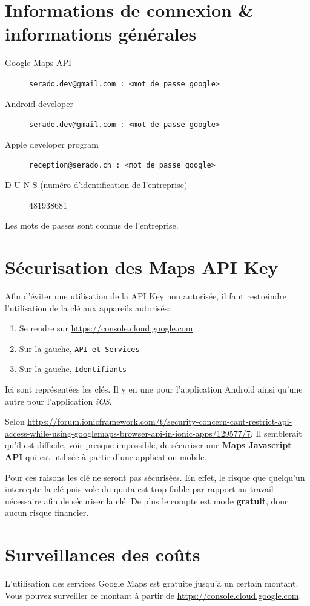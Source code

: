 \documentclass[french]{report}
\begin{document}
\section{Informations de connexion \& informations générales}
\begin{description}
    \item[Google Maps API] \verb|serado.dev@gmail.com : <mot de passe google>|
    \item[Android developer] \verb|serado.dev@gmail.com : <mot de passe google>|
    \item[Apple developer program] \verb|reception@serado.ch : <mot de passe google>| 
    \item[D-U-N-S (numéro d'identification de l'entreprise)] 481938681
\end{description}

Les mots de passes sont connus de l'entreprise.

\section{Sécurisation des Maps API Key}\label{sec:api_key}
Afin d'éviter une utilisation de la API Key non autorisée, il faut restreindre
l'utilisation de la clé aux appareils autorisés:
\begin{enumerate}
    \item Se rendre sur \url{https://console.cloud.google.com}\label{cloud}
    \item Sur la gauche, \verb|API et Services|
    \item Sur la gauche, \verb|Identifiants|
\end{enumerate}
Ici sont représentées les clés. Il y en une pour l'application Android ainsi qu'une
autre pour l'application \textit{iOS}.

Selon \url{https://forum.ionicframework.com/t/security-concern-cant-restrict-api-access-while-using-googlemaps-browser-api-in-ionic-apps/129577/7},
Il semblerait qu'il est difficile, voir presque impossible, de sécuriser une \textbf{Maps
 Javascript API} qui est utilisée à partir d'une application mobile.

Pour ces raisons les clé ne seront pas sécurisées. En effet, le risque que quelqu'un
intercepte la clé puis vole du quota est trop faible par rapport au travail nécessaire
afin de sécuriser la clé. De plus le compte est mode \textbf{gratuit}, donc aucun
risque financier. 

\section{Surveillances des coûts}
L'utilisation des services Google Maps est gratuite jusqu'à un certain montant.
Vous pouvez surveiller ce montant à partir de \url{https://console.cloud.google.com}.
\end{document}
